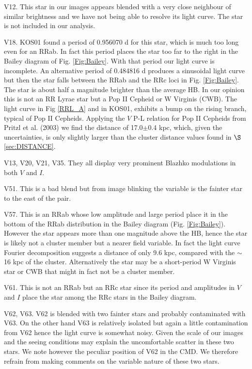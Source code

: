 \documentclass[journal]{rmaa}
\newcommand{\1}{\'{\i}}
\begin{document}
V12. This star in our images appears blended with a very close neighbour of similar
brightness and we have not being able to resolve its light curve. The star is not
included in our analysis.

V18. KOS01 found a period of 0.956070 d for this star, which is much too long even for
an
RRab. In fact this period places the star too far to the right in the Bailey diagram
of Fig. \ref{Fig:Bailey}. With that period our light curve is incomplete. An
alternative period of 0.484816 d produces a sinusoidal light curve but then the star
falls between the RRab and the RRc loci in Fig. \ref{Fig:Bailey}. The star is
about half a magnitude brighter than the average HB. In our opinion this is not an RR
Lyrae star but a Pop II Cepheid or W Virginis (CWB). The light curve in Fig
\ref{RRL_A} and in KOS01, exhibits a bump on the rising branch, typical of Pop II
Cepheids. Applying the $V$ P-L relation for Pop II Cepheids from Pritzl et al. (2003)
we find the distance of 17.0$\pm$0.4 kpc, which, given the uncertainties, is only
slightly larger than the cluster distance values found in $\S$ \ref{sec:DISTANCE}.

V13, V20, V21, V35. They all display very prominent Blazhko modulations in
both $V$ and $I$.

V51. This is a bad blend but from image blinking the variable is the fainter star
to the east of the pair.

V57. This is an RRab whose low amplitude and large period place it in the bottom
of the RRab distribution in the Bailey diagram (Fig. \ref{Fig:Bailey}). However the
star appears more than one magnitude above the HB, hence the star is likely not a
cluster member but a nearer field variable. In fact the light curve Fourier
decomposition suggests a distance of only 9.6 kpc, compared with the $\sim$16 kpc
of the cluster. Alternatively the star may be a short-period W Virginis star or
CWB that might in fact not be a cluster member.

V61. This is not an RRab but an RRc star since its period and amplitudes in $V$ and
$I$ place the star among the RRc stars in the Bailey diagram.

V62, V63. V62 is blended with two fainter stars and probably contaminated with V63.
On the other hand V63 is relatively isolated but again a little
  contamination from V62 hence the light curve is somewhat noisy.
Given the scale of our images and the seeing
conditions may explain the uncomfortable scatter in these two stars. We note however
the peculiar position of V62 in the CMD. We therefore refrain from making comments on
the variable nature of these two stars.
\end{document}
